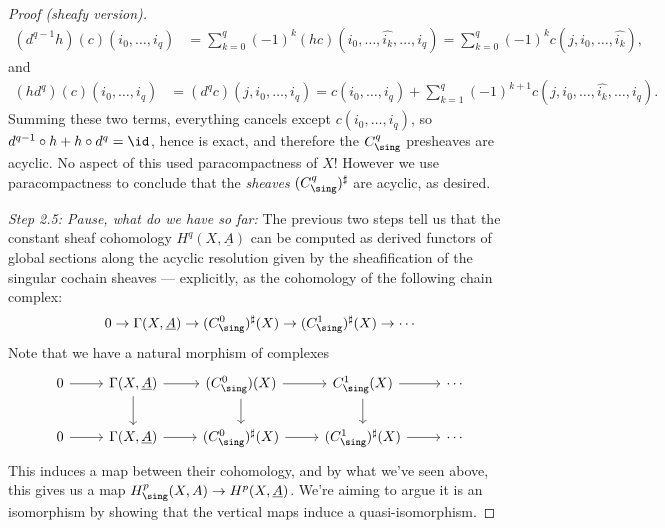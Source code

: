 \documentclass[11pt]{book}
\begin{document}
\begin{proof}[Proof (sheafy version)]
\begin{align*}
    (d^{q-1} h)(c)(i_0, \ldots, i_q) &= \sum_{k=0}^q (-1)^k (hc)(i_0, \ldots, \widehat{i_k}, \ldots, i_q) = \sum_{k=0}^q (-1)^k c(j,i_0, \ldots, \widehat{i_k}),
\end{align*}
and
\begin{align*}
    (h d^q)(c)(i_0, \ldots, i_q) &= (d^q c)(j,i_0, \ldots, i_{q}) = c(i_0, \ldots, i_q) + \sum_{k=1}^q (-1)^{k+1} c(j,i_0, \ldots, \widehat{i_k}, \ldots, i_q).
\end{align*}
Summing these two terms, everything cancels except $c(i_0, \ldots, i_q)$, so $d^{q-1}\circ h + h\circ d^{q} = \id$, hence  is exact, and therefore the $C^q_\sing$ presheaves are acyclic. No aspect of this used paracompactness of $X$! However we use paracompactness to conclude that the \emph{sheaves} $(C^q_\sing)^\sharp$ are acyclic, as desired.

\emph{Step 2.5: Pause, what do we have so far:} The previous two steps tell us that the constant sheaf cohomology $H^q(X,\underline{A})$ can be computed as derived functors of global sections along the acyclic resolution given by the sheafification of the singular cochain sheaves --- explicitly, as the cohomology of the following chain complex:
\begin{align*}
    0 \to \Gamma(X,\underline{A}) \to (C^0_\sing)^\sharp(X) \to (C^1_\sing)^\sharp(X) \to \cdots 
\end{align*}
Note that we have a natural morphism of complexes
\[ \begin{tikzcd}
    0\rar & {\Gamma(X,\underline{A})}\rar\dar & (C^0_\sing)(X)\rar\dar & C^1_\sing(X)\rar\dar & \cdots \\
    0\rar & {\Gamma(X,\underline{A})}\rar & (C^0_\sing)^\sharp(X)\rar & (C^1_\sing)^\sharp(X)\rar & \cdots
\end{tikzcd} \]
This induces a map between their cohomology, and by what we've seen above, this gives us a map $H^p_\sing(X,A) \to H^p(X, \underline{A})$. We're aiming to argue it is an isomorphism by showing that the vertical maps induce a quasi-isomorphism.


\end{proof}
\end{document}
